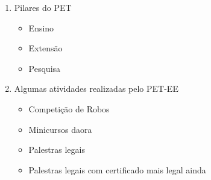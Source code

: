 \begin{enumerate}
    \item Pilares do PET
    \begin{itemize}
        \item Ensino
        \item Extensão
        \item Pesquisa
    \end{itemize}
    \item Algumas atividades realizadas pelo PET-EE
    \begin{itemize}
        \item Competição de Robos
        \item Minicursos daora
        \item Palestras legais
        \item Palestras legais com certificado mais legal ainda
    \end{itemize}
\end{enumerate}